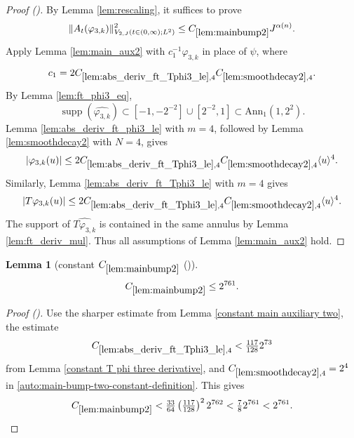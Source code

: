\documentclass[12pt,reqno]{amsart}
\newcommand{\auto}{{({\tiny\faCar})}}
\theoremstyle{plain}
\newtheorem{lemma}[theorem]{Lemma}
\numberwithin{equation}{section}
\theoremstyle{remark}
\newcommand{\using}[1]{}
\begin{document}
\begin{proof}[Proof \auto]
By Lemma \ref{lem:rescaling}, it suffices to prove
\begin{equation}\label{mainbump2_1}
\|A_t(\varphi_{3,k})\|_{V_{2,J}(t\in(0,\infty);L^2)}^2
\le C_{\ref{lem:mainbump2}}J^{\alpha(n)}.
\end{equation}
Apply Lemma \ref{lem:main_aux2} with $c_1^{-1}\varphi_{3,k}$ in place of $\psi$, where
\[
c_1=2C_{\ref{lem:abs_deriv_ft_Tphi3_le},4}C_{\ref{lem:smoothdecay2},4}.
\]
By Lemma \ref{lem:ft_phi3_eq},
\begin{equation}\label{mainbump2_supp}
\operatorname{supp}(\widehat{\varphi_{3,k}})
\subset[-1,-2^{-2}]\cup[2^{-2},1]
\subset\mathrm{Ann}_1(1,2^2).
\end{equation}
Lemma \ref{lem:abs_deriv_ft_phi3_le} with $m=4$, followed by Lemma \ref{lem:smoothdecay2} with $N=4$, gives
\begin{equation}\label{mainbump2_dec1}
|\varphi_{3,k}(u)|
\le2C_{\ref{lem:abs_deriv_ft_Tphi3_le},4}C_{\ref{lem:smoothdecay2},4}\langle u\rangle^4.
\end{equation}
Similarly, Lemma \ref{lem:abs_deriv_ft_Tphi3_le} with $m=4$ gives
\begin{equation}\label{mainbump2_dec2}
|T\varphi_{3,k}(u)|
\le2C_{\ref{lem:abs_deriv_ft_Tphi3_le},4}C_{\ref{lem:smoothdecay2},4}\langle u\rangle^4.
\end{equation}
The support of $\widehat{T\varphi_{3,k}}$ is contained in the same annulus by Lemma \ref{lem:ft_deriv_mul}. Thus all assumptions of Lemma \ref{lem:main_aux2} hold.
\end{proof}

\begin{lemma}[constant $C_{\ref{lem:mainbump2}}$ \auto]\label{constant main bump two}\using{constant main auxiliary two}\using{lem:abs_deriv_ft_Tphi3_le}\using{constant T phi three derivative}\using{lem:smoothdecay2}\using{lem:mainbump2}
\begin{equation}\label{constant main bump two bound}
C_{\ref{lem:mainbump2}}\le2^{761}.
\end{equation}
\end{lemma}
\begin{proof}[Proof \auto]
Use the sharper estimate from Lemma \ref{constant main auxiliary two}, the estimate
\[
C_{\ref{lem:abs_deriv_ft_Tphi3_le},4}<\tfrac{117}{128}2^{73}
\]
from Lemma \ref{constant T phi three derivative}, and $C_{\ref{lem:smoothdecay2},4}=2^4$ in \eqref{auto:main-bump-two-constant-definition}. This gives
\[
C_{\ref{lem:mainbump2}}
<\tfrac{33}{64}\left(\tfrac{117}{128}\right)^2 2^{762}
<\tfrac{7}{8}2^{761}<2^{761}.
\]
\end{proof}
\end{document}
